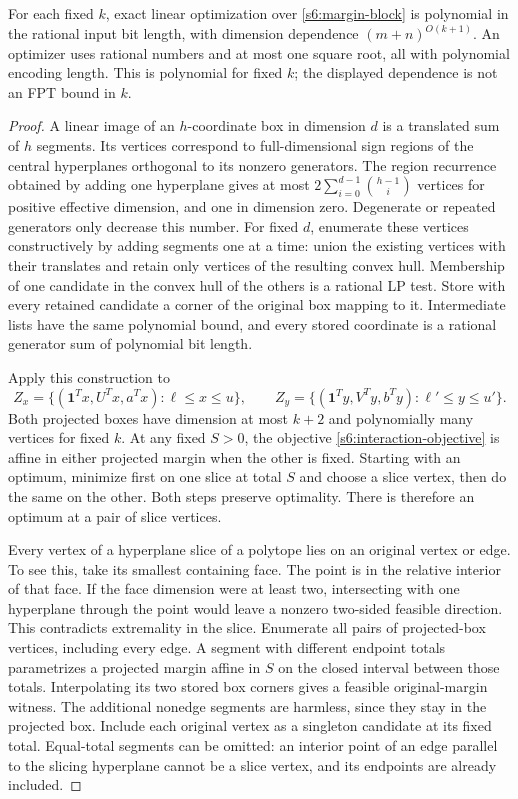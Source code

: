 \begin{theorem}\label{s6:rank-theorem}
For each fixed $k$, exact linear optimization over \eqref{s6:margin-block}
is polynomial in the rational input bit length, with dimension dependence
$(m+n)^{O(k+1)}$. An optimizer uses rational numbers and at most one
square root, all with polynomial encoding length. This is polynomial
for fixed $k$; the displayed dependence is not an FPT bound in $k$.
\end{theorem}
\begin{proof}
A linear image of an $h$-coordinate box in dimension $d$ is a translated
sum of $h$ segments. Its vertices correspond to full-dimensional sign
regions of the central hyperplanes orthogonal to its nonzero generators.
The region recurrence obtained by adding one hyperplane gives at most
$2\sum_{i=0}^{d-1}\binom{h-1}{i}$ vertices for positive effective
dimension, and one in dimension zero. Degenerate or repeated generators
only decrease this number. For fixed $d$, enumerate these vertices
constructively by adding segments one at a time: union the existing
vertices with their translates and retain only vertices of the resulting
convex hull. Membership of one candidate in the convex hull of the others
is a rational LP test. Store with every retained candidate a corner of
the original box mapping to it. Intermediate lists have the same
polynomial bound, and every stored coordinate is a rational generator
sum of polynomial bit length.

Apply this construction to
\[
 Z_x=\{(\mathbf1^Tx,U^Tx,a^Tx):\ell\le x\le u\},\qquad
 Z_y=\{(\mathbf1^Ty,V^Ty,b^Ty):\ell'\le y\le u'\}.
\]
Both projected boxes have dimension at most $k+2$ and polynomially many
vertices for fixed $k$. At any fixed $S>0$, the objective
\eqref{s6:interaction-objective} is affine in either projected margin
when the other is fixed. Starting with an optimum, minimize first on
one slice at total $S$ and choose a slice vertex, then do the same on
the other. Both steps preserve optimality. There is therefore an optimum
at a pair of slice vertices.

Every vertex of a hyperplane slice of a polytope lies on an original
vertex or edge. To see this, take its smallest containing face. The
point is in the relative interior of that face. If the face dimension
were at least two, intersecting with one hyperplane through the point
would leave a nonzero two-sided feasible direction. This contradicts
extremality in the slice.
Enumerate all pairs of projected-box vertices, including every edge.
A segment with different endpoint totals parametrizes a projected margin
affine in $S$ on the closed interval between those totals. Interpolating
its two stored box corners gives a feasible original-margin witness.
The additional nonedge segments are harmless, since they stay in the
projected box. Include each original vertex as a singleton candidate
at its fixed total. Equal-total segments can be omitted: an interior
point of an edge parallel to the slicing hyperplane cannot be a slice
vertex, and its endpoints are already included.


\end{proof}
